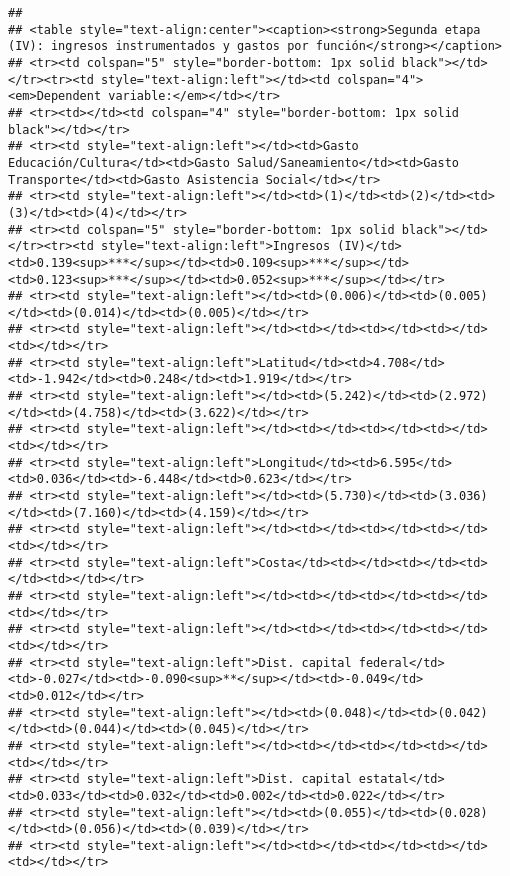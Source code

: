 \documentclass[
]{article}
\begin{document}
\begin{verbatim}
## 
## <table style="text-align:center"><caption><strong>Segunda etapa (IV): ingresos instrumentados y gastos por función</strong></caption>
## <tr><td colspan="5" style="border-bottom: 1px solid black"></td></tr><tr><td style="text-align:left"></td><td colspan="4"><em>Dependent variable:</em></td></tr>
## <tr><td></td><td colspan="4" style="border-bottom: 1px solid black"></td></tr>
## <tr><td style="text-align:left"></td><td>Gasto Educación/Cultura</td><td>Gasto Salud/Saneamiento</td><td>Gasto Transporte</td><td>Gasto Asistencia Social</td></tr>
## <tr><td style="text-align:left"></td><td>(1)</td><td>(2)</td><td>(3)</td><td>(4)</td></tr>
## <tr><td colspan="5" style="border-bottom: 1px solid black"></td></tr><tr><td style="text-align:left">Ingresos (IV)</td><td>0.139<sup>***</sup></td><td>0.109<sup>***</sup></td><td>0.123<sup>***</sup></td><td>0.052<sup>***</sup></td></tr>
## <tr><td style="text-align:left"></td><td>(0.006)</td><td>(0.005)</td><td>(0.014)</td><td>(0.005)</td></tr>
## <tr><td style="text-align:left"></td><td></td><td></td><td></td><td></td></tr>
## <tr><td style="text-align:left">Latitud</td><td>4.708</td><td>-1.942</td><td>0.248</td><td>1.919</td></tr>
## <tr><td style="text-align:left"></td><td>(5.242)</td><td>(2.972)</td><td>(4.758)</td><td>(3.622)</td></tr>
## <tr><td style="text-align:left"></td><td></td><td></td><td></td><td></td></tr>
## <tr><td style="text-align:left">Longitud</td><td>6.595</td><td>0.036</td><td>-6.448</td><td>0.623</td></tr>
## <tr><td style="text-align:left"></td><td>(5.730)</td><td>(3.036)</td><td>(7.160)</td><td>(4.159)</td></tr>
## <tr><td style="text-align:left"></td><td></td><td></td><td></td><td></td></tr>
## <tr><td style="text-align:left">Costa</td><td></td><td></td><td></td><td></td></tr>
## <tr><td style="text-align:left"></td><td></td><td></td><td></td><td></td></tr>
## <tr><td style="text-align:left"></td><td></td><td></td><td></td><td></td></tr>
## <tr><td style="text-align:left">Dist. capital federal</td><td>-0.027</td><td>-0.090<sup>**</sup></td><td>-0.049</td><td>0.012</td></tr>
## <tr><td style="text-align:left"></td><td>(0.048)</td><td>(0.042)</td><td>(0.044)</td><td>(0.045)</td></tr>
## <tr><td style="text-align:left"></td><td></td><td></td><td></td><td></td></tr>
## <tr><td style="text-align:left">Dist. capital estatal</td><td>0.033</td><td>0.032</td><td>0.002</td><td>0.022</td></tr>
## <tr><td style="text-align:left"></td><td>(0.055)</td><td>(0.028)</td><td>(0.056)</td><td>(0.039)</td></tr>
## <tr><td style="text-align:left"></td><td></td><td></td><td></td><td></td></tr>

\end{verbatim}
\end{document}
